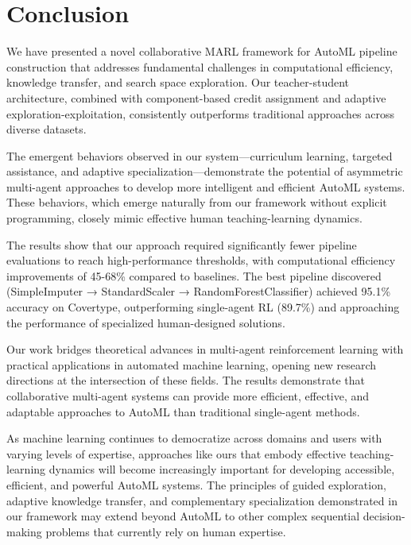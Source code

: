 \documentclass[twoside,11pt]{article}
\begin{document}
\section{Conclusion}

We have presented a novel collaborative MARL framework for AutoML pipeline construction that addresses fundamental challenges in computational efficiency, knowledge transfer, and search space exploration. Our teacher-student architecture, combined with component-based credit assignment and adaptive exploration-exploitation, consistently outperforms traditional approaches across diverse datasets.

The emergent behaviors observed in our system—curriculum learning, targeted assistance, and adaptive specialization—demonstrate the potential of asymmetric multi-agent approaches to develop more intelligent and efficient AutoML systems. These behaviors, which emerge naturally from our framework without explicit programming, closely mimic effective human teaching-learning dynamics.

The results show that our approach required significantly fewer pipeline evaluations to reach high-performance thresholds, with computational efficiency improvements of 45-68\% compared to baselines. The best pipeline discovered (SimpleImputer → StandardScaler → RandomForestClassifier) achieved 95.1\% accuracy on Covertype, outperforming single-agent RL (89.7\%) and approaching the performance of specialized human-designed solutions.

Our work bridges theoretical advances in multi-agent reinforcement learning with practical applications in automated machine learning, opening new research directions at the intersection of these fields. The results demonstrate that collaborative multi-agent systems can provide more efficient, effective, and adaptable approaches to AutoML than traditional single-agent methods.

As machine learning continues to democratize across domains and users with varying levels of expertise, approaches like ours that embody effective teaching-learning dynamics will become increasingly important for developing accessible, efficient, and powerful AutoML systems. The principles of guided exploration, adaptive knowledge transfer, and complementary specialization demonstrated in our framework may extend beyond AutoML to other complex sequential decision-making problems that currently rely on human expertise.


\end{document}
